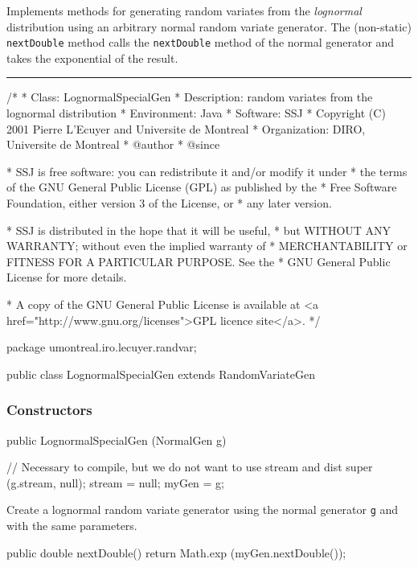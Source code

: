 
Implements methods for generating random variates from the 
{\em lognormal\/} distribution using an arbitrary normal random 
variate generator.
The (non-static) \texttt{nextDouble} method calls the \texttt{nextDouble} 
method of the normal generator and takes the exponential of the result.


\bigskip\hrule

\begin{code}
\begin{hide}
/*
 * Class:        LognormalSpecialGen
 * Description:  random variates from the lognormal distribution
 * Environment:  Java
 * Software:     SSJ 
 * Copyright (C) 2001  Pierre L'Ecuyer and Universite de Montreal
 * Organization: DIRO, Universite de Montreal
 * @author       
 * @since

 * SSJ is free software: you can redistribute it and/or modify it under
 * the terms of the GNU General Public License (GPL) as published by the
 * Free Software Foundation, either version 3 of the License, or
 * any later version.

 * SSJ is distributed in the hope that it will be useful,
 * but WITHOUT ANY WARRANTY; without even the implied warranty of
 * MERCHANTABILITY or FITNESS FOR A PARTICULAR PURPOSE.  See the
 * GNU General Public License for more details.

 * A copy of the GNU General Public License is available at
   <a href="http://www.gnu.org/licenses">GPL licence site</a>.
 */
\end{hide}
package umontreal.iro.lecuyer.randvar;\begin{hide}
\end{hide}

public class LognormalSpecialGen extends RandomVariateGen \begin{hide} {

   NormalGen myGen;
\end{hide}\end{code}

\subsubsection* {Constructors}

\begin{code}
   public LognormalSpecialGen (NormalGen g) \begin{hide} {
      // Necessary to compile, but we do not want to use stream and dist
      super (g.stream, null);
      stream = null;
      myGen = g;
   }\end{hide}
\end{code}
 \begin{tabb}  Create a lognormal random variate generator 
   using the normal generator \texttt{g} and with the same parameters.
 \end{tabb}

\begin{code}\begin{hide} 

   public double nextDouble() {
      return Math.exp (myGen.nextDouble());
   }\end{hide}
\begin{hide}
}\end{hide}
\end{code}
